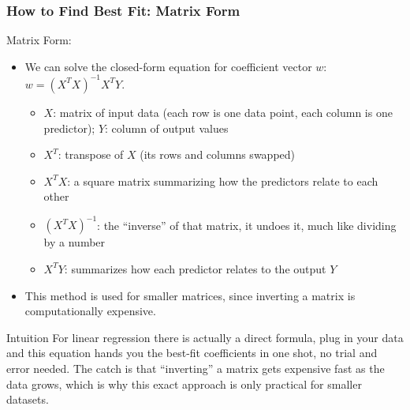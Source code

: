 \begin{frame}[fragile]\frametitle{How to Find Best Fit: Matrix Form}
Matrix Form:
\begin{itemize}
\item  We can solve the closed-form equation for coefficient vector $w$: $w = (X^T X)^{-1} X^T Y$.
	\begin{itemize}
	\item $X$: matrix of input data (each row is one data point, each column is one predictor); $Y$: column of output values
	\item $X^T$: transpose of $X$ (its rows and columns swapped)
	\item $X^T X$: a square matrix summarizing how the predictors relate to each other
	\item $(X^T X)^{-1}$: the ``inverse'' of that matrix, it undoes it, much like dividing by a number
	\item $X^T Y$: summarizes how each predictor relates to the output $Y$
	\end{itemize}
\item This method is used for smaller matrices, since inverting a matrix is computationally expensive.
\end{itemize}
\begin{block}{Intuition}
For linear regression there is actually a direct formula, plug in your data and this equation hands you the best-fit coefficients in one shot, no trial and error needed. The catch is that ``inverting'' a matrix gets expensive fast as the data grows, which is why this exact approach is only practical for smaller datasets.
\end{block}
\end{frame}

